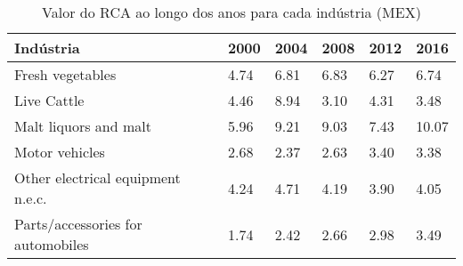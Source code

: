 \begin{table}
\centering
\caption{Valor do RCA ao longo dos anos para cada indústria (MEX)}
\label{tab:ex3-tempo-MEX}
\begin{tabular}{p{6cm}p{1.5cm}p{1.5cm}p{1.5cm}p{1.5cm}p{1.5cm}}
\toprule
                        Indústria & 2000 & 2004 & 2008 & 2012 &  2016 \\
\midrule
                 Fresh vegetables & 4.74 & 6.81 & 6.83 & 6.27 &  6.74 \\
                      Live Cattle & 4.46 & 8.94 & 3.10 & 4.31 &  3.48 \\
            Malt liquors and malt & 5.96 & 9.21 & 9.03 & 7.43 & 10.07 \\
                   Motor vehicles & 2.68 & 2.37 & 2.63 & 3.40 &  3.38 \\
Other electrical equipment n.e.c. & 4.24 & 4.71 & 4.19 & 3.90 &  4.05 \\
Parts/accessories for automobiles & 1.74 & 2.42 & 2.66 & 2.98 &  3.49 \\
\bottomrule
\end{tabular}
\end{table}
